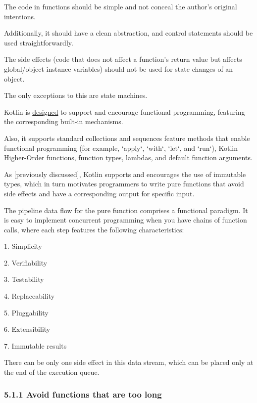 {{{{The code in functions should be simple and not conceal the author's original intentions.



Additionally, it should have a clean abstraction, and control statements should be used straightforwardly.

The side effects (code that does not affect a function's return value but affects global/object instance variables) should not be used for state changes of an object.

The only exceptions to this are state machines.



Kotlin is \href{https://www.slideshare.net/abreslav/whos-more-functional-kotlin-groovy-scala-or-java}{designed} to support and encourage functional programming, featuring the corresponding built-in mechanisms.

Also, it supports standard collections and sequences feature methods that enable functional programming (for example, `apply`, `with`, `let`, and `run`), Kotlin Higher-Order functions, function types, lambdas, and default function arguments.

As [previously discussed], Kotlin supports and encourages the use of immutable types, which in turn motivates programmers to write pure functions that avoid side effects and have a corresponding output for specific input. 

The pipeline data flow for the pure function comprises a functional paradigm. It is easy to implement concurrent programming when you have chains of function calls, where each step features the following characteristics:

1.	Simplicity

2.	Verifiability

3.	Testability

4.	Replaceability

5.	Pluggability

6.	Extensibility

7.	Immutable results



There can be only one side effect in this data stream, which can be placed only at the end of the execution queue.



\subsubsection*{\textbf{5.1.1 Avoid functions that are too long}}
\leavevmode\newline

}}}}
